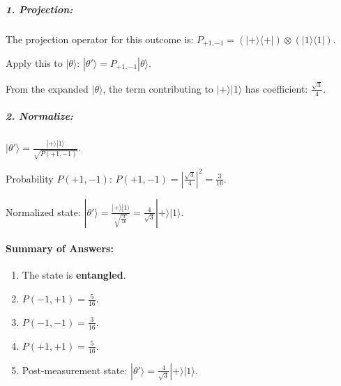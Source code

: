 \documentclass[11pt]{article}
\makeatletter
\providecommand{\tightlist}{%
      \setlength{\itemsep}{0pt}\setlength{\parskip}{0pt}}
\newcommand{\boxspacing}{\kern\kvtcb@left@rule\kern\kvtcb@boxsep}
\newcommand{\prompt}[4]{
        {\ttfamily\llap{{\color{#2}[#3]:\hspace{3pt}#4}}\vspace{-\baselineskip}}
    }
\makeatother
\begin{document}
\subparagraph{1. Projection:}\label{projection}

The projection operator for this outcome is:
\(P_{+1, -1} = (|+\rangle \langle +|) \otimes (|1\rangle \langle 1|).\)

Apply this to \(|\theta\rangle\):
\(|\theta'\rangle = P_{+1, -1} |\theta\rangle.\)

From the expanded \(|\theta\rangle\), the term contributing to
\(|+\rangle|1\rangle\) has coefficient: \(\frac{\sqrt{3}}{4}.\)

\subparagraph{2. Normalize:}\label{normalize}

\(|\theta'\rangle = \frac{|+\rangle|1\rangle}{\sqrt{P(+1, -1)}}.\)

Probability \(P(+1, -1)\):
\(P(+1, -1) = \left|\frac{\sqrt{3}}{4}\right|^2 = \frac{3}{16}.\)

Normalized state:
\(|\theta'\rangle = \frac{|+\rangle|1\rangle}{\sqrt{\frac{3}{16}}} = \frac{4}{\sqrt{3}} |+\rangle|1\rangle.\)

\paragraph{\texorpdfstring{\textbf{Summary of
Answers:}}{Summary of Answers:}}\label{summary-of-answers}

\begin{enumerate}
\def\labelenumi{\alph{enumi})}
\tightlist
\item
  The state is \textbf{entangled}.\\
\item
  \(P(-1, +1) = \frac{5}{16}\).\\
\item
  \(P(-1, -1) = \frac{3}{16}\).\\
\item
  \(P(+1, +1) = \frac{5}{16}\).\\
\item
  Post-measurement state:
  \(|\theta'\rangle = \frac{4}{\sqrt{3}} |+\rangle|1\rangle\).
\end{enumerate}

    \begin{tcolorbox}[breakable, size=fbox, boxrule=1pt, pad at break*=1mm,colback=cellbackground, colframe=cellborder]
\prompt{In}{incolor}{ }{\boxspacing}
\begin{Verbatim}[commandchars=\\\{\}]

\end{Verbatim}
\end{tcolorbox}


    
    
    
\end{document}
